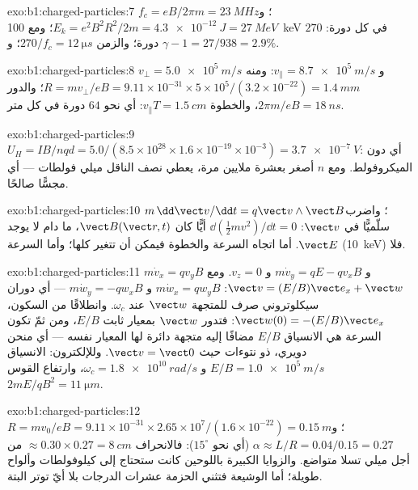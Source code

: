 \begin{solution}{exo:b1:charged-particles:7}
$f_c = eB/2\pi m = \qty{23}{MHz}$؛ و $E_k = e^2B^2R^2/2m = \qty{4.3e-12}{J} =
\qty{27}{MeV}$؛ ومع \qty{100}{keV} في كل دورة: $270$ دورة؛ والزمن $270/f_c =
\qty{12}{\micro s}$؛ و $\gamma - 1 = 27/938 = 2.9\%$.
\end{solution}

\begin{solution}{exo:b1:charged-particles:8}
$v_\perp = \qty{5.0e5}{m/s}$ و $v_\parallel = \qty{8.7e5}{m/s}$: ومنه $R = mv_\perp/eB
= 9.11\times10^{-31} \times 5\times10^5/(3.2\times10^{-22}) = \qty{1.4}{mm}$؛
والدور $2\pi m/eB = \qty{18}{ns}$، والخطوة $v_\parallel T = \qty{1.5}{cm}$:
أي نحو $64$ دورة في كل متر.
\end{solution}

\begin{solution}{exo:b1:charged-particles:9}
$U_H = IB/nqd = 5.0/(8.5\times10^{28} \times 1.6\times10^{-19} \times 10^{-3})
= \qty{3.7e-7}{V}$: أي دون الميكروفولط. ومع $n$ أصغر بعشرة ملايين مرة، يعطي
نصف الناقل ميلي فولطات --- أي مجسًّا صالحًا.
\end{solution}

\begin{solution}{exo:b1:charged-particles:10}
$m\,\dd\vect v/\dd t = q\vect v\wedge\vect B$؛ واضرب سلّميًّا في $\vect v$: $\dd(\tfrac12 mv^2)/
\dd t = 0$ أيًّا كان $\vect B(\vect r, t)$، ما دام لا يوجد $\vect E$. أما
اتجاه السرعة  والخطوة فيمكن أن تتغير كلها؛
وأما السرعة  (\qty{10}{keV}) فلا.
\end{solution}

\begin{solution}{exo:b1:charged-particles:11}
$m\dot v_x = qv_yB$ و $m\dot v_y = qE - qv_xB$ و $v_z = 0$. ومع $\vect v =
(E/B)\vect e_x + \vect w$: $m\dot w_x = qw_yB$ و $m\dot w_y = -qw_xB$ --- أي
دوران سيكلوتروني صرف للمتجهة $\vect w$ عند $\omega_c$. وانطلاقًا من السكون،
$\vect w(0) = -(E/B)\vect e_x$: فتدور $\vect w$ بمعيار ثابت $E/B$، ومن ثمّ تكون
السرعة هي الانسياق $E/B$ مضافًا إليه متجهة دائرة لها المعيار نفسه ---
أي منحن دويري، ذو نتوءات حيث $\vect v = \vect 0$. وللإلكترون: الانسياق $E/B =
\qty{1.0e5}{m/s}$ و $\omega_c = \qty{1.8e10}{rad/s}$، وارتفاع القوس $2mE/qB^2 =
\qty{11}{\micro m}$.
\end{solution}

\begin{solution}{exo:b1:charged-particles:12}
$R = mv_0/eB = 9.11\times10^{-31} \times 2.65\times10^7/(1.6\times10^{-22}) =
\qty{0.15}{m}$؛ و $\alpha \approx L/R = 0.04/0.15 = 0.27$ (أي نحو $15^\circ$):
فالانحراف $\approx 0.30 \times 0.27 = \qty{8}{cm}$ من أجل
ميلي تسلا متواضع. والزوايا الكبيرة باللوحين كانت ستحتاج إلى كيلوفولطات وألواح
طويلة؛ أما الوشيعة فتثني الحزمة عشرات الدرجات بلا أيّ توتر
البتة.
\end{solution}


